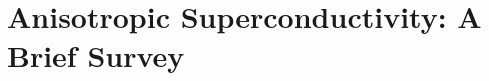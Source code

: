 \setcounter{chapter}{1}
\chapter{Anisotropic Superconductivity: A Brief Survey}
\label{othersys}
\pagestyle{headings}





